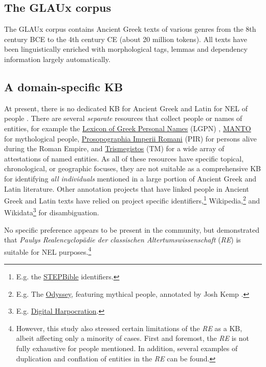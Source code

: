 \documentclass[final]{anthology-ch}
\begin{document}
\subsection{The GLAUx corpus} \label{sec:GLAUx}
The GLAUx corpus \cite{Keersmaekers_2021} contains Ancient Greek texts of various genres from the 8th century BCE to the 4th century CE (about 20 million tokens). All texts have been linguistically enriched with morphological tags, lemmas and dependency information largely automatically.

\subsection{A domain-specific KB} \label{sec:kb}
At present, there is no dedicated KB for Ancient Greek and Latin for NEL of people \cite{broux_cooperation_2025}. There are several \textit{separate} resources that collect people or names of entities, for example the \href{https://search.lgpn.ox.ac.uk/index.html}{Lexicon of Greek Personal Names} (LGPN) \cite{LGPN}, \href{https://manto.unh.edu/viewer.p/60/2616/scenario/1/geo/}{MANTO} \cite{MANTO} for mythological people, \href{https://pir.bbaw.de/}{Prosopographia Imperii Romani} (PIR) \cite{DigitalPIR} for persons alive during the Roman Empire, and \href{https://trismegistos.org/}{Trismegistos} (TM) \cite{depauw_trismegistos_2014} for a wide array of attestations of named entities. As all of these resources have specific topical, chronological, or geographic focuses, they are not suitable as a comprehensive KB for identifying \textit{all individuals} mentioned in a large portion of Ancient Greek and Latin literature. Other annotation projects that have linked people in Ancient Greek and Latin texts have relied on project specific identifiers,\footnote{E.g. the \href{https://github.com/STEPBible/STEPBible-Data/blob/master/TIPNR\%20-\%20Translators\%20Individualised\%20Proper\%20Names\%20with\%20all\%20References\%20-\%20STEPBible.org\%20CC\%20BY.txt}{STEPBible} identifiers.}  Wikipedia,\footnote{E.g. The \href{https://beyond-translation.scaife-viewer.org/reader/urn:cts:greekLit:tlg0012.tlg002.perseus-grc2:1}{Odyssey}, featuring mythical people, annotated by Josh Kemp \cite{kempTranslationBuildingBetter2021}.} and Wikidata\footnote{E.g. \href{https://www.lagl.org/tools/harpocration}{Digital Harpocration}.} for disambiguation.

No specific preference appears to be present in the community, but \textcite{degraafNescioCarneadesIste2024} demonstrated that \textit{Paulys Realencyclopädie der classischen Altertumswissenschaft} (\textit{RE}) is suitable for NEL purposes.\footnote{However, this study also stressed certain limitations of the \textit{RE} as a KB, albeit affecting only a minority of cases.  First and foremost, the \textit{RE} is not fully exhaustive for people mentioned. In addition, several examples of duplication and conflation of entities in the \textit{RE} can be found.}
\end{document}
